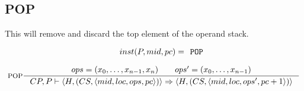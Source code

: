 \subsection{POP}
This will remove and discard the top element of the operand stack.

$$\inference[POP]{
inst(P, mid, pc) = \texttt{POP} \semnl \\
ops = (x_0, \ldots, x_{n-1}, x_n) \semsp 
ops' = (x_0, \ldots, x_{n-1})}
{CP, P \vdash \langle H, (CS, \langle mid, loc, ops, pc \rangle)\rangle  \Rightarrow \langle H, (CS, \langle mid, loc, ops', pc + 1 \rangle)\rangle}$$
